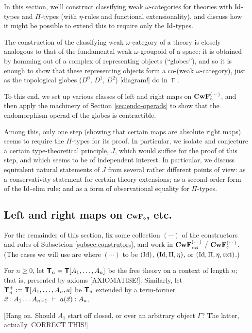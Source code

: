 \documentclass{amsart}
\newcommand{\ext}{\mathrm{ext}}
\newcommand{\Jbar}{\overline{J}}
\newcommand{\stuff}{{(\cdots)}}
\begin{document}
In this section, we'll construct classifying weak $\omega$-categories for theories with $\mathrm{Id}$-types and $\Pi$-types (with $\eta$-rules and functional extensionality), and discuss how it might be possible to extend this to require only the $\mathrm{Id}$-types.

The construction of the classifying weak $\omega$-category of a theory is closely analogous to that of the fundamental weak $\omega$-groupoid of a space: it is obtained by homming out of a complex of representing objects (``globes''), and so it is enough to show that these representing objects form a co-(weak $\omega$-category), just as the topological globes ($D^0$, $D^1$, $D^2$) [diagram!] do in $\Top$.

To this end, we set up various classes of left and right maps on $\CwF^{\stuff}_\diamond$, and
then apply the machinery of Section \ref{sec:endo-operads} to show that the endomorphism operad of the globes is contractible.

Among this, only one step (showing that certain maps are absolute right maps) seems to require the $\Pi$-types for its proof.  In particular, we isolate and conjecture a certain type-theoretical principle, $\Jbar$, which would suffice for the proof of this step, and which seems to be of independent interest.  In particular, we discuss equivalent natural statements of $\Jbar$ from several rather different points of view: as a conservativity statement for certain theory extensions; as a second-order form of the $\mathrm{Id}$-elim rule; and as a form of observational equality for $\Pi$-types. 


\subsection{Left and right maps on $\mathbf{CwF}_\diamond$, etc.}

For the remainder of this section, fix some collection $\stuff$ of the constructors and rules of Subsetcion \ref{subsec:construtors}, and work in $\CwF^\stuff_\cxl$ / $\CwF^\stuff_\diamond$.  (The cases we will use are where $\stuff$ to be $(\mathrm{Id})$, $(\mathrm{Id},\Pi,\eta)$, or $(\Id,\Pi,\eta,\ext)$.)

For $n \geq 0$, let $\textbf{\textsf{T}}_n = \textbf{\textsf{T}}[A_1,\ldots,A_n]$ be the free theory on a context of length $n$; that is, presented by axioms [AXIOMATISE!].  Similarly, let $\textbf{\textsf{T}}^+_n := \textbf{\textsf{T}}[A_1,\ldots,A_n, a]$ be $\textbf{\textsf{T}}_n$ extended by a term-former $\vec x: A_1 \ldots A_{n-1}\ \vdash\ a(\vec x) : A_n$.

[Hang on.  Should $A_1$ start off closed, or over an arbitrary object $\Gamma$?  The latter, actually.  CORRECT THIS!]
\end{document}
